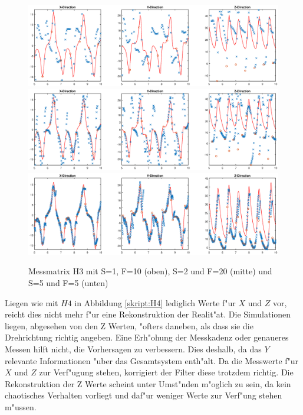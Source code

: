 \begin{refsection}
\begin{figure}
\centering
\includegraphics[width=\hsize]{kalman/figures/H3R10S1.eps}
\includegraphics[width=\hsize]{kalman/figures/H3R20S2.eps}
\includegraphics[width=\hsize]{kalman/figures/H3R05S5.eps}
\caption{Messmatrix H3 mit S=1, F=10 (oben), S=2 und F=20 (mitte) und S=5 und F=5 (unten)}
\label{skript:H3}
\end{figure}

Liegen wie mit $H4$ in Abbildung \ref{skript:H4} lediglich Werte f"ur $X$ und $Z$ vor, reicht dies nicht mehr f"ur eine Rekonstruktion der Realit"at. Die Simulationen liegen, abgesehen von den Z Werten, "ofters daneben, als dass sie die Drehrichtung richtig angeben. Eine Erh"ohung der Messkadenz oder genaueres Messen hilft nicht, die Vorhersagen zu verbessern. Dies deshalb, da das $Y$ relevante Informationen "uber das Gesamtsystem enth"alt.
Da die Messwerte f"ur $X$ und $Z$ zur Verf"ugung stehen, korrigiert der Filter diese trotzdem richtig.
Die Rekonstruktion der Z Werte scheint unter Umst"nden m"oglich zu sein, da kein chaotisches Verhalten vorliegt und daf"ur weniger Werte zur Verf"ung stehen m"ussen.


\end{refsection}
